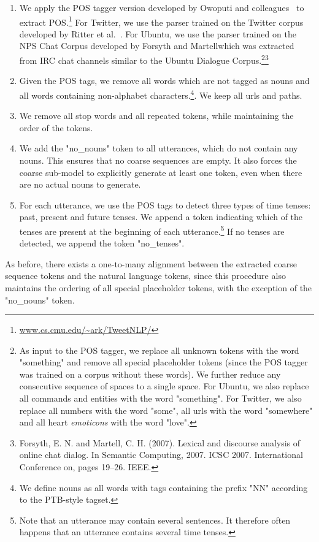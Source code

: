 \documentclass{article}
\begin{document}
\begin{enumerate}
\item We apply the POS tagger version  developed by Owoputi and colleagues~\cite{owoputi2013improved} to extract POS.\footnote{\url{www.cs.cmu.edu/~ark/TweetNLP/}} For Twitter, we use the parser trained on the Twitter corpus developed by Ritter et al.~\cite{Ritter:2011:NER:2145432.2145595}. 
For Ubuntu, we use the parser trained on the NPS Chat Corpus developed by Forsyth and Martellwhich was extracted from IRC chat channels similar to the Ubuntu Dialogue Corpus.\footnote{As input to the POS tagger, we replace all unknown tokens with the word "something" and remove all special placeholder tokens (since the POS tagger was trained on a corpus without these words). We further reduce any consecutive sequence of spaces to a single space. For Ubuntu, we also replace all commands and entities with the word "something". For Twitter, we also replace all numbers with the word "some", all urls with the word "somewhere" and all heart \textit{emoticons} with the word "love".}\footnote{Forsyth, E. N. and Martell, C. H. (2007). Lexical and discourse analysis of online chat dialog. In Semantic
Computing, 2007. ICSC 2007. International Conference on, pages 19–26. IEEE.}
\item Given the POS tags, we remove all words which are not tagged as nouns and all words containing non-alphabet characters.\footnote{We define nouns as all words with tags containing the prefix "NN" according to the PTB-style tagset.}. We keep all urls and paths.
\item We remove all stop words and all repeated tokens, while maintaining the order of the tokens.
\item We add the "no\_nouns" token to all utterances, which do not contain any nouns. This ensures that no coarse sequences are empty. It also forces the coarse sub-model to explicitly generate at least one token, even when there are no actual nouns to generate.
\item For each utterance, we use the POS tags to detect three types of time tenses: past, present and future tenses. We append a token indicating which of the  tenses are present at the beginning of each utterance.\footnote{Note that an utterance may contain several sentences. It therefore often happens that an utterance contains several time tenses.} If no tenses are detected, we append the token "no\_tenses".
\end{enumerate}

As before, there exists a one-to-many alignment between the extracted coarse sequence tokens and the natural language tokens, since this procedure also maintains the ordering of all special placeholder tokens, with the exception of the "no\_nouns" token.
\end{document}
